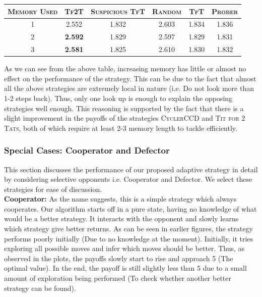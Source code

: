 \documentclass[a4paper]{article}
\begin{document}
	\begin{table}[H]
	  \begin{center}
	    \begin{tabular}{|c|c|c|c|c|c|}
	      \toprule
	 	  \textsc{Memory Used} & \textsc{Tf2T} & {\footnotesize{\textsc{Suspicious TfT}}} & \textsc{Random} & \textsc{TfT} & \textsc{Prober}\\
	      \midrule
		  1	& 2.552 & 1.832 & 2.603 & 1.834 & 1.836\\
		  2 & \textbf{2.592} & 1.829 & 2.597 & 1.829 & 1.831\\
		  3 & \textbf{2.581} & 1.825 & 2.610 & 1.830 & 1.832\\
		\bottomrule
	    \end{tabular}
	  \end{center}
	\end{table}  		
	 
	As we can see from the above table, increasing memory has little or almost no effect on the performance of the strategy. This can be due to the fact that almost all the above strategies are extremely local in nature (i.e. Do not look more than 1-2 steps back). Thus, only one look up is enough to explain the opposing strategies well enough. This reasoning is supported by the fact that there is a slight improvement in the payoffs of the strategies  \textsc{CyclerCCD} and \textsc{Tit for 2 Tats}, both of which require at least 2-3 memory length to tackle efficiently.
	 
	\subsubsection{Special Cases: Cooperator and Defector}

	This section discusses the performance of our proposed adaptive strategy in detail by considering selective opponents i.e. Cooperator and Defector. We select these strategies for ease of discussion.\\
	
	\noindent
	\textbf{Cooperator: } As the name suggests, this is a simple strategy which always cooperates. Our algorithm starts off in a pure state, having no knowledge of what would be a better strategy. It interacts with the opponent and slowly learns which strategy give better returns. As can be seen in earlier figures, the strategy performs poorly initially (Due to no knowledge at the moment). Initially, it tries exploring all possible moves and infer which moves should be better. Thus, as observed in the plots, the payoffs slowly start to rise and approach 5 (The optimal value). In the end, the payoff is still slightly less than 5 due to a small amount of exploration being performed (To check whether another better strategy can be found).\\
	
\end{document}
